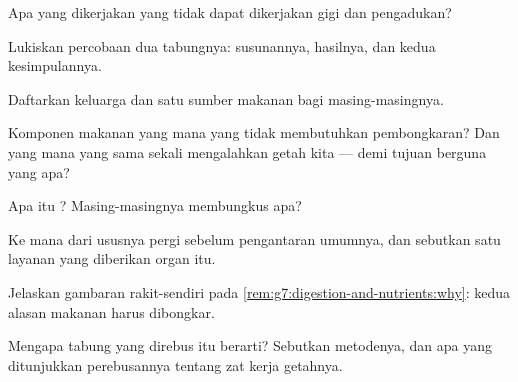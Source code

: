 \begin{exercise}[$\star$]\label{exo:g7:digestion-and-nutrients:1}
Apa yang dikerjakan  yang tidak dapat dikerjakan gigi
dan pengadukan?
\end{exercise}

\begin{exercise}[$\star$]\label{exo:g7:digestion-and-nutrients:2}
Lukiskan percobaan  dua tabungnya: susunannya, hasilnya, dan
kedua kesimpulannya.
\end{exercise}

\begin{exercise}[$\star$]\label{exo:g7:digestion-and-nutrients:3}
Daftarkan keluarga  dan satu sumber makanan bagi
masing-masingnya.
\end{exercise}

\begin{exercise}[$\star$]\label{exo:g7:digestion-and-nutrients:4}
Komponen makanan yang mana yang tidak membutuhkan pembongkaran? Dan
yang mana yang sama sekali mengalahkan getah kita --- demi tujuan
berguna yang apa?
\end{exercise}

\begin{exercise}[$\star$]\label{exo:g7:digestion-and-nutrients:5}
Apa itu ? Masing-masingnya membungkus apa?
\end{exercise}

\begin{exercise}[$\star$]\label{exo:g7:digestion-and-nutrients:6}
Ke mana  dari ususnya pergi sebelum pengantaran umumnya, dan
sebutkan satu layanan yang diberikan organ itu.
\end{exercise}

\begin{exercise}[$\star\star$]\label{exo:g7:digestion-and-nutrients:7}
Jelaskan gambaran rakit-sendiri pada
\cref{rem:g7:digestion-and-nutrients:why}: kedua alasan makanan harus
dibongkar.
\end{exercise}

\begin{exercise}[$\star\star$]\label{exo:g7:digestion-and-nutrients:8}
Mengapa tabung  yang direbus itu berarti? Sebutkan metodenya,
dan apa yang ditunjukkan perebusannya tentang zat kerja getahnya.
\end{exercise}

